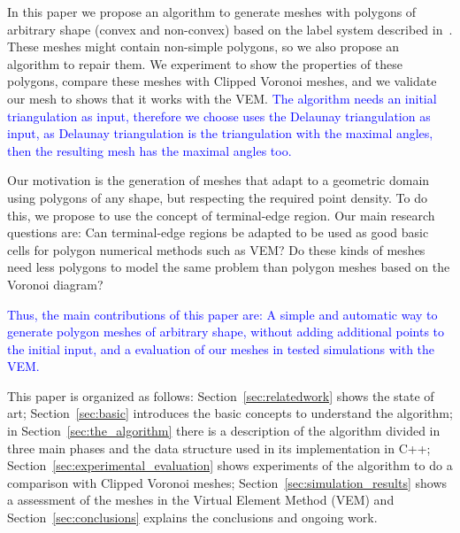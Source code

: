 \documentclass[pdflatex,sn-mathphys]{sn-jnl}%
\theoremstyle{thmstyleone}%
\theoremstyle{thmstyletwo}%
\theoremstyle{thmstylethree}%
\begin{document}




In this paper we propose an algorithm to generate meshes with polygons of arbitrary shape (convex and non-convex) based on the label system described in~\cite{Ojeda2018ANA}. These meshes might contain non-simple polygons, so we also propose an algorithm to repair them. We  experiment to show the properties of these polygons, compare these meshes with Clipped Voronoi meshes, and we validate our mesh to shows that it works with the VEM. \textcolor{blue}{The algorithm needs an initial triangulation as input, therefore we choose uses the Delaunay triangulation as input, as Delaunay triangulation is the triangulation with the maximal angles, then the resulting mesh has the maximal angles too.}

Our motivation is the generation of meshes that adapt to a geometric domain using  polygons of any shape, but respecting the required point density. To do this, we propose to use the concept of terminal-edge region. Our main research questions are: Can terminal-edge regions be adapted to be used as good basic cells for polygon numerical methods such as VEM? Do these kinds of meshes need less polygons to model the same problem than polygon meshes based on the Voronoi diagram? 

%
\textcolor{blue}{Thus, the main contributions of this paper are: A simple and automatic way to generate polygon meshes of arbitrary shape, without adding additional points to the initial input, and a evaluation of our meshes in tested simulations with the VEM.}


This paper is organized as follows: Section~\ref{sec:relatedwork} shows the state of art;  Section~\ref{sec:basic} introduces the basic concepts to understand the algorithm; in Section~\ref{sec:the_algorithm} there is a description of the algorithm divided in three main phases and the data structure used in its implementation in C++; Section~\ref{sec:experimental_evaluation} shows experiments of the algorithm to do a comparison with Clipped Voronoi meshes; Section~\ref{sec:simulation_results} shows a assessment of the meshes in the Virtual Element Method (VEM) and Section~\ref{sec:conclusions} explains the conclusions and ongoing work.
\end{document}

